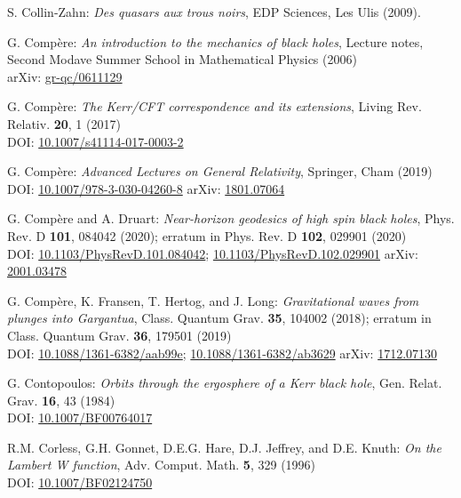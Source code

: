 \begin{thebibliography}{123}
S. Collin-Zahn:
{\em Des quasars aux trous noirs},
EDP Sciences, Les Ulis (2009).

G. Compère:
{\em An introduction to the mechanics of black holes},
Lecture notes, Second Modave Summer School in Mathematical Physics (2006)\\
arXiv: \href{https://arxiv.org/abs/gr-qc/0611129}{gr-qc/0611129}

G. Compère:
{\em The Kerr/CFT correspondence and its extensions},
Living Rev. Relativ. {\bf 20}, 1 (2017)\\
DOI: \href{https://doi.org/10.1007/s41114-017-0003-2}{10.1007/s41114-017-0003-2}

G. Compère:
{\em Advanced Lectures on General Relativity},
Springer, Cham (2019)\\
DOI: \href{https://doi.org/10.1007/978-3-030-04260-8}{10.1007/978-3-030-04260-8}\hfill
arXiv: \href{https://arxiv.org/abs/1801.07064}{1801.07064}

G. Compère and A. Druart:
{\em Near-horizon geodesics of high spin black holes},
Phys. Rev. D {\bf 101}, 084042 (2020); erratum in Phys. Rev. D {\bf 102}, 029901 (2020)\\
DOI: \href{https://doi.org/10.1103/PhysRevD.101.084042}{10.1103/PhysRevD.101.084042};
\href{https://doi.org/10.1103/PhysRevD.102.029901}{10.1103/PhysRevD.102.029901}\hfill
arXiv: \href{https://arxiv.org/abs/2001.03478}{2001.03478}

G. Compère, K. Fransen, T. Hertog, and J. Long:
{\em Gravitational waves from plunges into Gargantua},
Class. Quantum Grav. {\bf 35}, 104002 (2018);
erratum in Class. Quantum Grav. {\bf 36}, 179501 (2019) \\
DOI: \href{https://doi.org/10.1088/1361-6382/aab99e}{10.1088/1361-6382/aab99e};
\href{https://doi.org/10.1088/1361-6382/ab3629}{10.1088/1361-6382/ab3629}
\hfill
arXiv: \href{https://arxiv.org/abs/1712.07130}{1712.07130}

G. Contopoulos:
{\em Orbits through the ergosphere of a Kerr black hole},
Gen. Relat. Grav. {\bf 16}, 43 (1984)\\
DOI: \href{https://doi.org/10.1007/BF00764017}{10.1007/BF00764017}

R.M. Corless, G.H. Gonnet, D.E.G. Hare, D.J. Jeffrey, and D.E. Knuth:
{\em On the Lambert W function},
Adv. Comput. Math. {\bf 5}, 329 (1996)\\
DOI: \href{https://doi.org/10.1007/BF02124750}{10.1007/BF02124750}


\end{thebibliography}
